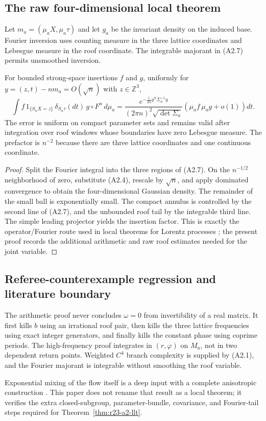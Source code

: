 \subsection{The raw four-dimensional local theorem}

Let $m_a=(\mu_aX,\mu_a\tau)$ and let $g_a$ be the invariant density on the
induced base.  Fourier inversion uses counting measure in the three lattice
coordinates and Lebesgue measure in the roof coordinate.  The integrable
majorant in (A2.7) permits unsmoothed inversion.

\begin{theorem}
\label{thm:r23-a2-llt}
For bounded strong-space insertions $f$ and $g$, uniformly for
$y=(z,t)-nm_a=O(\sqrt n)$ with $z\in\mathbb Z^3$,
\[
 \int f\,1_{\{S_nX=z\}}\,\delta_{S_n\tau}(dt)\,g\circ F^n\,d\mu_a
 =\frac{e^{-\frac1{2n}y^{\mathsf T}\Sigma_a^{-1}y}}
 {(2\pi n)^2\sqrt{\det\Sigma_a}}
 \left(\mu_a f\,\mu_a g+o(1)\right)dt.                  \tag{A2.8}
\]
The error is uniform on compact parameter sets and remains valid after
integration over roof windows whose boundaries have zero Lebesgue measure.
The prefactor is $n^{-2}$ because there are three lattice coordinates and one
continuous coordinate.
\end{theorem}

\begin{proof}
Split the Fourier integral into the three regions of (A2.7).  On the
$n^{-1/2}$ neighborhood of zero, substitute (A2.4), rescale by $\sqrt n$, and
apply dominated convergence to obtain the four-dimensional Gaussian density.
The remainder of the small ball is exponentially small.  The compact annulus
is controlled by the second line of (A2.7), and the unbounded roof tail by the
integrable third line.  The simple leading projector yields the insertion
factor.  This is exactly the operator/Fourier route used in local theorems for
Lorentz processes \cite{SzaszVarju2004}; the present proof records the
additional arithmetic and raw roof estimates needed for the joint variable.
\end{proof}

\subsection{Referee-counterexample regression and literature boundary}

The arithmetic proof never concludes $\omega=0$ from invertibility of a real
matrix.  It first kills $b$ using an irrational roof pair, then kills the three
lattice frequencies using exact integer generators, and finally kills the
constant phase using coprime periods.  The high-frequency proof integrates in
$(r,\varphi)$ on $M_a$, not in two dependent return points.  Weighted
$C^4$ branch complexity is supplied by (A2.1), and the Fourier majorant is
integrable without smoothing the roof variable.

Exponential mixing of the flow itself is a deep input with a complete
anisotropic construction \cite{BaladiDemersLiverani2018}.  This paper does not
rename that result as a local theorem; it verifies the extra closed-subgroup,
parameter-bundle, covariance, and Fourier-tail steps required for
Theorem~\ref{thm:r23-a2-llt}.
